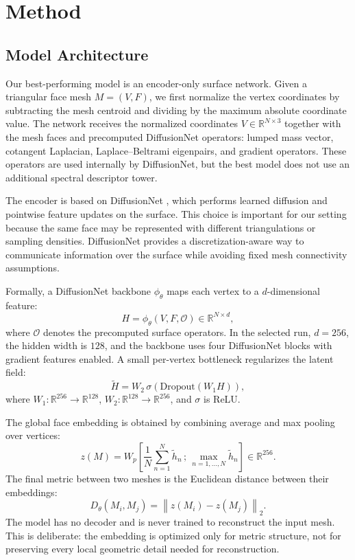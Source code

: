 \documentclass{article}
\begin{document}
\section{Method}

\subsection{Model Architecture}

Our best-performing model is an encoder-only surface network. Given a triangular face mesh $M=(V,F)$, we first normalize the vertex coordinates by subtracting the mesh centroid and dividing by the maximum absolute coordinate value. The network receives the normalized coordinates $V\in\mathbb{R}^{N\times 3}$ together with the mesh faces and precomputed DiffusionNet operators: lumped mass vector, cotangent Laplacian, Laplace--Beltrami eigenpairs, and gradient operators. These operators are used internally by DiffusionNet, but the best model does not use an additional spectral descriptor tower.

The encoder is based on DiffusionNet \citep{sharp2022diffusionnet}, which performs learned diffusion and pointwise feature updates on the surface. This choice is important for our setting because the same face may be represented with different triangulations or sampling densities. DiffusionNet provides a discretization-aware way to communicate information over the surface while avoiding fixed mesh connectivity assumptions.

Formally, a DiffusionNet backbone $\phi_\theta$ maps each vertex to a $d$-dimensional feature:
\begin{equation}
    H = \phi_\theta(V,F,\mathcal{O}) \in \mathbb{R}^{N\times d},
\end{equation}
where $\mathcal{O}$ denotes the precomputed surface operators. In the selected run, $d=256$, the hidden width is $128$, and the backbone uses four DiffusionNet blocks with gradient features enabled. A small per-vertex bottleneck regularizes the latent field:
\begin{equation}
    \tilde{H}
    =
    W_2\,\sigma\!\left(\mathrm{Dropout}(W_1 H)\right),
\end{equation}
where $W_1:\mathbb{R}^{256}\rightarrow\mathbb{R}^{128}$, $W_2:\mathbb{R}^{128}\rightarrow\mathbb{R}^{256}$, and $\sigma$ is ReLU.

The global face embedding is obtained by combining average and max pooling over vertices:
\begin{equation}
    z(M)
    =
    W_p\left[
        \frac{1}{N}\sum_{n=1}^{N}\tilde{h}_n
        \,;\,
        \max_{n=1,\ldots,N}\tilde{h}_n
    \right]
    \in \mathbb{R}^{256}.
\end{equation}
The final metric between two meshes is the Euclidean distance between their embeddings:
\begin{equation}
    D_\theta(M_i,M_j)=\left\|z(M_i)-z(M_j)\right\|_2.
\end{equation}
The model has no decoder and is never trained to reconstruct the input mesh. This is deliberate: the embedding is optimized only for metric structure, not for preserving every local geometric detail needed for reconstruction.
\end{document}
